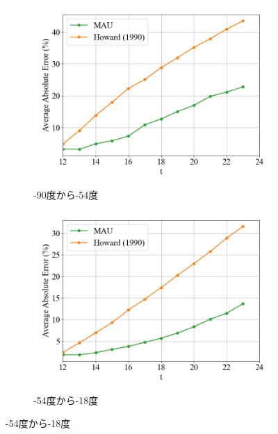           \begin{figure}[htbp]
            \begin{subfigure}{0.5\textwidth}
              \centering
              \includegraphics[width=\textwidth]{figures/exp1/lng_error_1.png}
              \caption{-90度から-54度}
              \label{fig:lng_error_1}
            \end{subfigure}
            \begin{subfigure}{0.5\textwidth}
              \centering
              \includegraphics[width=\textwidth]{figures/exp1/lng_error_2.png}
              \caption{-54度から-18度}
            \end{subfigure} \par

\end{figure}
